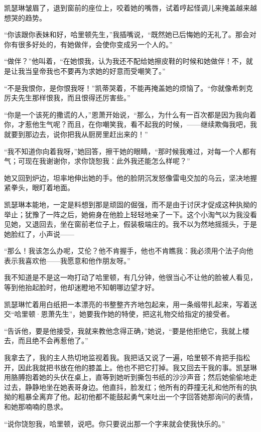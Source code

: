 \par 凯瑟琳皱眉了，退到窗前的座位上，咬着她的嘴唇，试着哼起怪调儿来掩盖越来越想哭的趋势。
\par “你该跟你表妹和好，哈里顿先生，”我插嘴说，“既然她已后悔她的无礼了。那会对你有很多好处的，有她做伴，会使你变成另一个人的。”
\par “做伴？”他叫着，“在她恨我，认为我还不配给她擦皮鞋的时候和她做伴！不，就是让我当皇帝我也不要再为求她的好意而受嘲笑了。”
\par “不是我恨你，是你恨我呀！”凯蒂哭着，不能再掩盖她的烦恼了。“你就像希刺克厉夫先生那样恨我，而且恨得还厉害些。”
\par “你是一个该死的撒谎的人，”恩萧开始说，“那么，为什么有一百次都是因为我向着你，才惹他生气呢？而且，在你嘲笑我，看不起我的时候，——继续欺侮我吧，我就要到那边去，说你把我从厨房里赶出来的！”
\par “我不知道你向着我呀，”她回答，擦干她的眼睛，“那时候我难过，对每一个人都有气；可现在我谢谢你，求你饶恕我：此外我还能怎么样呢？”
\par 她又回到炉边，坦率地伸出她的手。他的脸阴沉发怒像雷电交加的乌云，坚决地握紧拳头，眼盯着地面。
\par 凯瑟琳本能地，一定是料想到那是顽固的倔强，而不是由于讨厌才促成这种执拗的举止；犹豫了一阵之后，她俯身在他脸上轻轻地亲了一下。这个小淘气以为我没看见她，又退回去，坐在窗前老位子上，假装极端庄的。我不以为然地摇摇头，于是她脸红了，小声说——
\par “那么！我该怎么办呢，艾伦？他不肯握手，他也不肯瞧我：我必须用个法子向他表示我喜欢他——我愿意和他作朋友呀。”
\par 我不知道是不是这一吻打动了哈里顿，有几分钟，他很当心不让他的脸被人看见，等到他抬起脸时，他却迷瞪地不知朝哪边望才好。
\par 凯瑟琳忙着用白纸把一本漂亮的书整整齐齐地包起来，用一条缎带扎起来，写着送交“哈里顿·恩萧先生”，她要我作她的特使，把这礼物交给指定的接受者。
\par “告诉他，要是他接受，我就来教他念得正确，”她说，“要是他拒绝它，我就上楼去，而且绝不会再惹他了。”
\par 我拿去了，我的主人热切地监视着我。我把话又说了一遍，哈里顿不肯把手指松开，因此我就把书放在他的膝盖上。他也不把它打掉。我又回去干我的事。凯瑟琳用胳膊抱着她的头伏在桌上，直等到她听到撕包书纸的沙沙声音；然后她偷偷地走过去，静静地坐在她表哥身边。他直抖，脸发红；他所有的莽撞无礼和他所有的执拗的粗暴全离弃了他。起初他都不能鼓起勇气来吐出一个字回答她那询问的表情，和她那喃喃的恳求。
\par “说你饶恕我，哈里顿，说吧。你只要说出那一个字来就会使我快乐的。”
